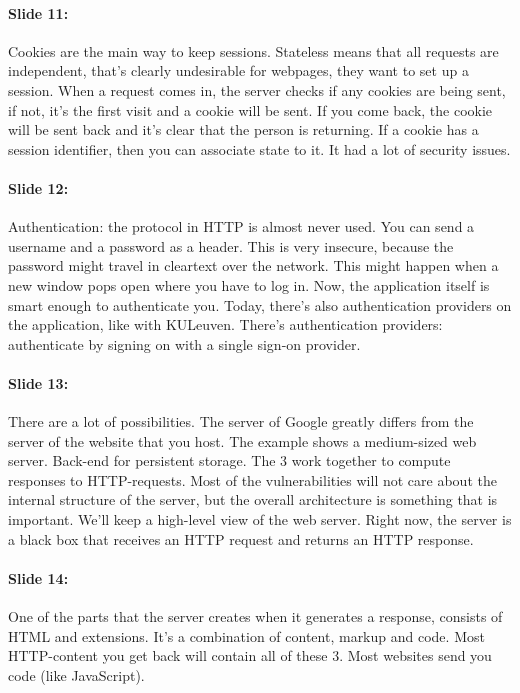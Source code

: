 \documentclass[10pt,a4paper]{report}
\begin{document}
\paragraph{Slide 11:} Cookies are the main way to keep sessions. Stateless means that all requests are independent, that's clearly undesirable for webpages, they want to set up a session. When a request comes in, the server checks if any cookies are being sent, if not, it's the first visit and a cookie will be sent. If you come back, the cookie will be sent back and it's clear that the person is returning. If a cookie has a session identifier, then you can associate state to it. 
It had a lot of security issues. 

\paragraph{Slide 12:} Authentication: the protocol in HTTP is almost never used. You can send a username and a password as a header. This is very insecure, because the password might travel in cleartext over the network. This might happen when a new window pops open where you have to log in. Now, the application itself is smart enough to authenticate you. 
Today, there's also authentication providers on the application, like with KULeuven. There's authentication providers: authenticate by signing on with a single sign-on provider. 

\paragraph{Slide 13:} There are a lot of possibilities. The server of Google greatly differs from the server of the website that you host. The example shows a medium-sized web server. Back-end for persistent storage.
The 3 work together to compute responses to HTTP-requests.
Most of the vulnerabilities will not care about the internal structure of the server, but the overall architecture is something that is important. We'll keep a high-level view of the web server. Right now, the server is a black box that receives an HTTP request and returns an HTTP response.

\paragraph{Slide 14:} One of the parts that the server creates when it generates a response, consists of HTML and extensions. It's a combination of content, markup and code. Most HTTP-content you get back will contain all of these 3. Most websites send you code (like JavaScript).
\end{document}
